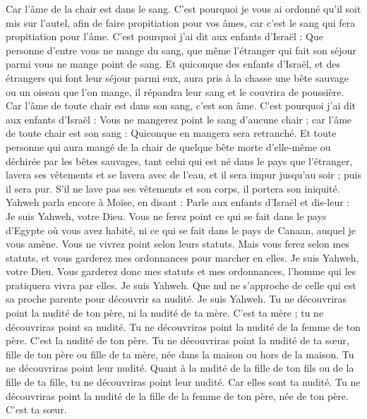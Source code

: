 \begin{multicols}{2}
Car l'âme de la chair est dans le sang. C'est pourquoi je vous ai ordonné qu'il soit mis sur l'autel, afin de faire propitiation pour vos âmes, car c'est le sang qui fera propitiation pour l'âme.
C'est pourquoi j'ai dit aux enfants d'Israël : Que personne d'entre vous ne mange du sang, que même l'étranger qui fait son séjour parmi vous ne mange point de sang.
Et quiconque des enfants d'Israël, et des étrangers qui font leur séjour parmi eux, aura pris à la chasse une bête sauvage ou un oiseau que l'on mange, il répandra leur sang et le couvrira de poussière.
Car l'âme de toute chair est dans son sang, c'est son âme. C'est pourquoi j'ai dit aux enfants d'Israël : Vous ne mangerez point le sang d'aucune chair ; car l'âme de toute chair est son sang : Quiconque en mangera sera retranché.
Et toute personne qui aura mangé de la chair de quelque bête morte d'elle-même ou déchirée par les bêtes sauvages, tant celui qui est né dans le pays que l'étranger, lavera ses vêtements et se lavera avec de l'eau, et il sera impur jusqu'au soir ; puis il sera pur.
S'il ne lave pas ses vêtements et son corps, il portera son iniquité.
\VerseOne{}Yahweh parla encore à Moïse, en disant :
Parle aux enfants d'Israël et dis-leur : Je suis Yahweh, votre Dieu.
Vous ne ferez point ce qui se fait dans le pays d'Egypte où vous avez habité, ni ce qui se fait dans le pays de Canaan, auquel je vous amène. Vous ne vivrez point selon leurs statuts.
Mais vous ferez selon mes statuts, et vous garderez mes ordonnances pour marcher en elles. Je suis Yahweh, votre Dieu.
Vous garderez donc mes statuts et mes ordonnances, l'homme qui les pratiquera vivra par elles. Je suis Yahweh.
Que nul ne s'approche de celle qui est sa proche parente pour découvrir sa nudité. Je suis Yahweh.
Tu ne découvriras point la nudité de ton père, ni la nudité de ta mère. C'est ta mère ; tu ne découvriras point sa nudité.
Tu ne découvriras point la nudité de la femme de ton père. C'est la nudité de ton père.
Tu ne découvriras point la nudité de ta sœur, fille de ton père ou fille de ta mère, née dans la maison ou hors de la maison. Tu ne découvriras point leur nudité.
Quant à la nudité de la fille de ton fils ou de la fille de ta fille, tu ne découvriras point leur nudité. Car elles sont ta nudité.
Tu ne découvriras point la nudité de la fille de la femme de ton père, née de ton père. C'est ta sœur.

\end{multicols}
